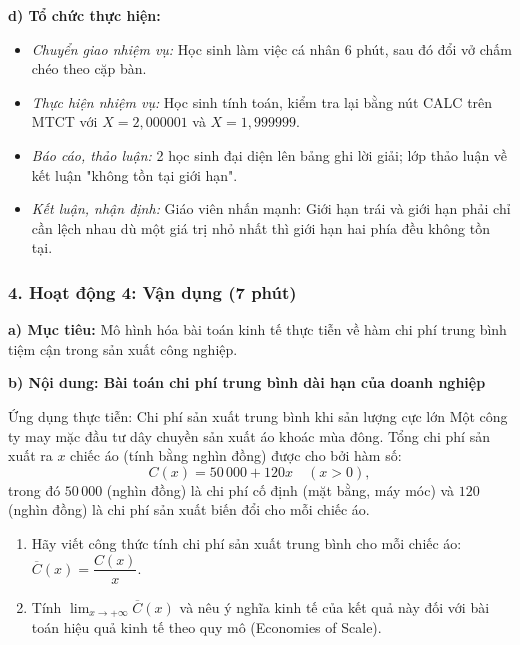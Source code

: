 \documentclass[12pt, a4paper]{article}
\begin{document}
\noindent \textbf{d) Tổ chức thực hiện:}
\begin{itemize}[leftmargin=0.8cm]
    \item \textit{Chuyển giao nhiệm vụ:} Học sinh làm việc cá nhân 6 phút, sau đó đổi vở chấm chéo theo cặp bàn.
    \item \textit{Thực hiện nhiệm vụ:} Học sinh tính toán, kiểm tra lại bằng nút CALC trên MTCT với $X = 2{,}000001$ và $X = 1{,}999999$.
    \item \textit{Báo cáo, thảo luận:} 2 học sinh đại diện lên bảng ghi lời giải; lớp thảo luận về kết luận "không tồn tại giới hạn".
    \item \textit{Kết luận, nhận định:} Giáo viên nhấn mạnh: Giới hạn trái và giới hạn phải chỉ cần lệch nhau dù một giá trị nhỏ nhất thì giới hạn hai phía đều không tồn tại.
\end{itemize}

\subsubsection*{4. Hoạt động 4: Vận dụng (7 phút)}

\noindent \textbf{a) Mục tiêu:}
Mô hình hóa bài toán kinh tế thực tiễn về hàm chi phí trung bình tiệm cận trong sản xuất công nghiệp.

\noindent \textbf{b) Nội dung: Bài toán chi phí trung bình dài hạn của doanh nghiệp}
\begin{pedabox}{Ứng dụng thực tiễn: Chi phí sản xuất trung bình khi sản lượng cực lớn}
Một công ty may mặc đầu tư dây chuyền sản xuất áo khoác mùa đông. Tổng chi phí sản xuất ra $x$ chiếc áo (tính bằng nghìn đồng) được cho bởi hàm số:
$$C(x) = 50\,000 + 120x \quad (x > 0),$$
trong đó $50\,000$ (nghìn đồng) là chi phí cố định (mặt bằng, máy móc) và $120$ (nghìn đồng) là chi phí sản xuất biến đổi cho mỗi chiếc áo.
\begin{enumerate}[leftmargin=0.6cm]
    \item Hãy viết công thức tính chi phí sản xuất trung bình cho mỗi chiếc áo: $\overline{C}(x) = \dfrac{C(x)}{x}$.
    \item Tính $\lim_{x \to +\infty} \overline{C}(x)$ và nêu ý nghĩa kinh tế của kết quả này đối với bài toán hiệu quả kinh tế theo quy mô (Economies of Scale).
\end{enumerate}
\end{pedabox}
\end{document}
